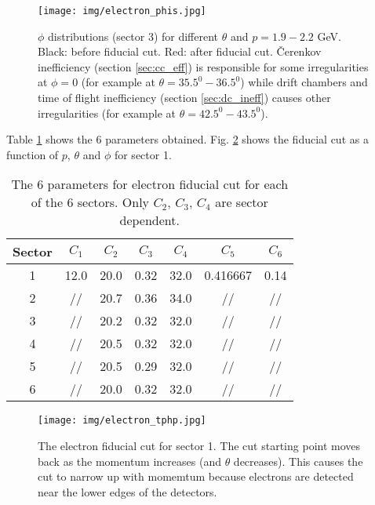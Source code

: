 \begin{figure}[ht]
	\centering
		\texttt{[image: img/electron\_phis.jpg]}
			\caption{$\phi$ distributions (sector 3) for different $\theta$ and
						$p=1.9-2.2$ GeV. Black: before fiducial cut. Red: after fiducial cut.
						\v Cerenkov inefficiency (section \ref{sec:cc_eff}) is responsible
						for some irregularities at $\phi = 0$ (for example at
						$\theta = 35.5^0 - 36.5^0$) while drift chambers and time of flight
						inefficiency (section \ref{sec:dc_ineff}) causes other irregularities
						(for example at  $\theta = 42.5^0 - 43.5^0$).}
			\label{fig:fidu_ephis}
\end{figure}
\clearpage\newpage
Table \ref{tab:fid_epars} shows the 6 parameters obtained. Fig. \ref{fig:fidu_e3d} shows
the fiducial cut as a function of $p$, $\theta$ and $\phi$ for sector 1.
\vspace{1cm}
\begin{table}[h]
 \begin{center}
  \begin{tabular}{|c|c|c|c|c|c|c|}
    \hline 
   Sector & $C_1$ & $C_2$ & $C_3$ & $C_4$     & $C_5$ & $C_6$ \\
    \hline  
   1 &     12.0 &  20.0 &  0.32 &  32.0 &  0.416667 &  0.14 \\
   2 &     //   &  20.7 &  0.36 &  34.0 &  //       &  // \\
   3 &     //   &  20.2 &  0.32 &  32.0 &  //       &  // \\
   4 &     //   &  20.5 &  0.32 &  32.0 &  //       &  // \\
   5 &     //   &  20.5 &  0.29 &  32.0 &  //       &  // \\
   6 &     //   &  20.0 &  0.32 &  32.0 &  //       &  // \\
 \hline
  \end{tabular}
 \end{center} 
 \caption[The 6 parameters for electron fiducial cut for each of the 6 sectors.]
{ The 6 parameters for electron fiducial cut for each of the 6 sectors.
	            Only $C_2$, $C_3$, $C_4$ are sector dependent. }
 \label{tab:fid_epars}
\end{table}

\begin{figure}[hb]
	\centering
		\texttt{[image: img/electron\_tphp.jpg]}
			\caption{The electron fiducial cut for sector 1. The cut starting point moves back
						as the momentum increases (and $\theta$ decreases). This causes the cut
						to narrow up with momemtum because electrons are detected near the lower
						edges of the detectors.}
			\label{fig:fidu_e3d}
\end{figure}



\clearpage\newpage








